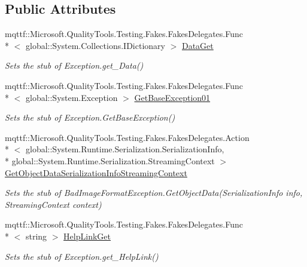 \subsection*{Public Attributes}
\begin{DoxyCompactItemize}
\item 
mqttf\-::\-Microsoft.\-Quality\-Tools.\-Testing.\-Fakes.\-Fakes\-Delegates.\-Func\\*
$<$ global\-::\-System.\-Collections.\-I\-Dictionary $>$ \hyperlink{class_system_1_1_fakes_1_1_stub_bad_image_format_exception_af94686d54396d683ab96398cd324ad09}{Data\-Get}
\begin{DoxyCompactList}\small\item\em Sets the stub of Exception.\-get\-\_\-\-Data()\end{DoxyCompactList}\item 
mqttf\-::\-Microsoft.\-Quality\-Tools.\-Testing.\-Fakes.\-Fakes\-Delegates.\-Func\\*
$<$ global\-::\-System.\-Exception $>$ \hyperlink{class_system_1_1_fakes_1_1_stub_bad_image_format_exception_aee11b9a9bfe13113f82c2af177192215}{Get\-Base\-Exception01}
\begin{DoxyCompactList}\small\item\em Sets the stub of Exception.\-Get\-Base\-Exception()\end{DoxyCompactList}\item 
mqttf\-::\-Microsoft.\-Quality\-Tools.\-Testing.\-Fakes.\-Fakes\-Delegates.\-Action\\*
$<$ global\-::\-System.\-Runtime.\-Serialization.\-Serialization\-Info, \\*
global\-::\-System.\-Runtime.\-Serialization.\-Streaming\-Context $>$ \hyperlink{class_system_1_1_fakes_1_1_stub_bad_image_format_exception_aca7423eb410c52dda2552e2ae8e2dc1e}{Get\-Object\-Data\-Serialization\-Info\-Streaming\-Context}
\begin{DoxyCompactList}\small\item\em Sets the stub of Bad\-Image\-Format\-Exception.\-Get\-Object\-Data(\-Serialization\-Info info, Streaming\-Context context)\end{DoxyCompactList}\item 
mqttf\-::\-Microsoft.\-Quality\-Tools.\-Testing.\-Fakes.\-Fakes\-Delegates.\-Func\\*
$<$ string $>$ \hyperlink{class_system_1_1_fakes_1_1_stub_bad_image_format_exception_a064b4d08384000d3b5bc179f489855cb}{Help\-Link\-Get}
\begin{DoxyCompactList}\small\item\em Sets the stub of Exception.\-get\-\_\-\-Help\-Link()\end{DoxyCompactList}\item 

\end{DoxyCompactItemize}
